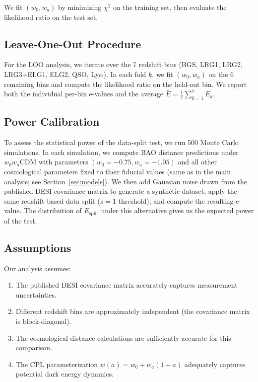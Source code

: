 \documentclass[11pt,a4paper]{article}
\begin{document}
We fit $(w_0, w_a)$ by minimizing $\chi^2$ on the training set, then evaluate the likelihood ratio on the test set.

\subsection{Leave-One-Out Procedure}

For the LOO analysis, we iterate over the 7 redshift bins (BGS, LRG1, LRG2, LRG3+ELG1, ELG2, QSO, Ly$\alpha$). In each fold $k$, we fit $(w_0, w_a)$ on the 6 remaining bins and compute the likelihood ratio on the held-out bin. We report both the individual per-bin e-values and the average $\bar{E} = \frac{1}{7}\sum_{k=1}^7 E_k$.

\subsection{Power Calibration}

To assess the statistical power of the data-split test, we run 500 Monte Carlo simulations. In each simulation, we compute BAO distance predictions under $w_0w_a$CDM with parameters $(w_0 = -0.75, w_a = -1.05)$ and all other cosmological parameters fixed to their fiducial values (same as in the main analysis; see Section~\ref{sec:models}). We then add Gaussian noise drawn from the published DESI covariance matrix to generate a synthetic dataset, apply the same redshift-based data split ($z = 1$ threshold), and compute the resulting e-value. The distribution of $E_{\text{split}}$ under this alternative gives us the expected power of the test.

\subsection{Assumptions}

Our analysis assumes:
\begin{enumerate}
    \item The published DESI covariance matrix accurately captures measurement uncertainties.
    \item Different redshift bins are approximately independent (the covariance matrix is block-diagonal).
    \item The cosmological distance calculations are sufficiently accurate for this comparison.
    \item The CPL parameterization $w(a) = w_0 + w_a(1-a)$ adequately captures potential dark energy dynamics.
\end{enumerate}
\end{document}

